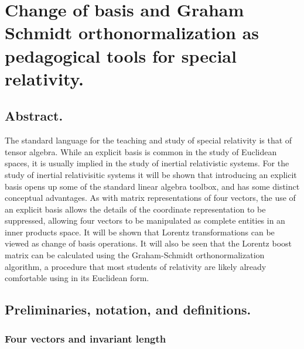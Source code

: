 
%

\chapter{Change of basis and Graham Schmidt orthonormalization as pedagogical tools for special relativity.}
\label{chap:grahamSchmidtLorentz}
{}
\date{April 14, 2011}

\beginArtWithToc

\section{Abstract.}

The standard language for the teaching and study of special relativity is that of tensor algebra.  
While an explicit basis is common in the study of Euclidean spaces, it is usually implied in the study of inertial relativistic systems.  
For the study of inertial relativisitic systems it will be shown that introducing an explicit basis opens up some of the standard linear algebra toolbox, and has some distinct conceptual advantages.
As with matrix representations of four vectors, the use of an explicit basis allows the details of the coordinate representation to be suppressed, allowing four vectors to be manipulated as complete entities in an inner products space.
It will be shown that Lorentz transformations can be viewed as change of basis operations.  It will also be seen that the Lorentz boost matrix can be calculated using the Graham-Schmidt orthonormalization algorithm, a procedure that most students of relativity are likely already comfortable using in its Euclidean form.

\section{Preliminaries, notation, and definitions.}

\subsection{Four vectors and invariant length}

